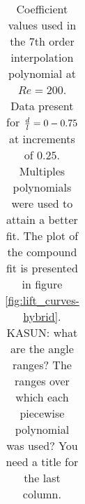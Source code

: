 \begin{table}[!h]
\begin{center}
\begin{tabular}{c c c c c c}
          
  
  
\hline %


\end{tabular}

\caption{Coefficient values used in the 7th order interpolation polynomial at $Re=200$. Data present for $\frac{d}{l}=0-0.75$ at increments of $0.25$. Multiples polynomials were used to attain a better fit. The plot of the compound fit is presented in figure \ref{fig:lift_curves-hybrid}. KASUN: what are the angle ranges? The ranges over which each piecewise polynomial was used? You need a title for the last column. } 
 
\label{table:cy-coefficients-hybrid} %
\end{center}
\end{table}

